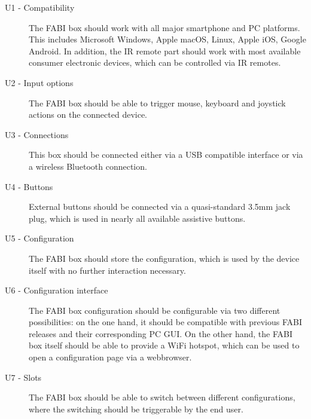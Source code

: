 \documentclass[]{scrreprt}%
\newcommand{\note}[1]{\textcolor{black!50}{\textit{Note: #1}}}
\begin{document}
\begin{description}
 \item[U1 - Compatibility] The FABI box should work with all major smartphone and PC platforms. This includes Microsoft Windows, Apple macOS, Linux, Apple iOS, Google Android. In addition, the IR remote part should work with most available consumer electronic devices, which can be controlled via IR remotes.
 \item[U2 - Input options] The FABI box should be able to trigger mouse, keyboard and joystick actions on the connected device.
 \item[U3 - Connections] This box should be connected either via a USB compatible interface or via a wireless Bluetooth connection.
 \item[U4 - Buttons] External buttons should be connected via a quasi-standard 3.5mm jack plug, which is used in nearly all available assistive buttons.
 \item[U5 - Configuration] The FABI box should store the configuration, which is used by the device itself with no further interaction necessary.
 \item[U6 - Configuration interface] The FABI box configuration should be configurable via two different possibilities: on the one hand, it should be compatible with previous FABI releases and their corresponding PC GUI. On the other hand, the FABI box itself should be able to provide a WiFi hotspot, which can be used to open a configuration page via a webbrowser.
 \item[U7 - Slots] The FABI box should be able to switch between different configurations, where the switching should be triggerable by the end user.
\end{description}


\end{document}
